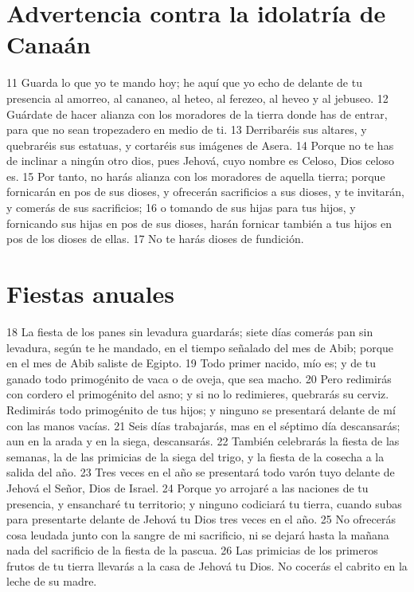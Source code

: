 \section*{Advertencia contra la idolatría de Canaán}

11 Guarda lo que yo te mando hoy; he aquí que yo echo de delante de tu presencia al amorreo, al cananeo, al heteo, al ferezeo, al heveo y al jebuseo.
12 Guárdate de hacer alianza con los moradores de la tierra donde has de entrar, para que no sean tropezadero en medio de ti.
13 Derribaréis sus altares, y quebraréis sus estatuas, y cortaréis sus imágenes de Asera.
14 Porque no te has de inclinar a ningún otro dios, pues Jehová, cuyo nombre es Celoso, Dios celoso es.
15 Por tanto, no harás alianza con los moradores de aquella tierra; porque fornicarán en pos de sus dioses, y ofrecerán sacrificios a sus dioses, y te invitarán, y comerás de sus sacrificios;
16 o tomando de sus hijas para tus hijos, y fornicando sus hijas en pos de sus dioses, harán fornicar también a tus hijos en pos de los dioses de ellas.
17 No te harás dioses de fundición.

\section*{Fiestas anuales}

18 La fiesta de los panes sin levadura guardarás; siete días comerás pan sin levadura, según te he mandado, en el tiempo señalado del mes de Abib; porque en el mes de Abib saliste de Egipto.
19 Todo primer nacido, mío es; y de tu ganado todo primogénito de vaca o de oveja, que sea macho.
20 Pero redimirás con cordero el primogénito del asno; y si no lo redimieres, quebrarás su cerviz. Redimirás todo primogénito de tus hijos; y ninguno se presentará delante de mí con las manos vacías.
21 Seis días trabajarás, mas en el séptimo día descansarás; aun en la arada y en la siega, descansarás.
22 También celebrarás la fiesta de las semanas, la de las primicias de la siega del trigo, y la fiesta de la cosecha a la salida del año.
23 Tres veces en el año se presentará todo varón tuyo delante de Jehová el Señor, Dios de Israel.
24 Porque yo arrojaré a las naciones de tu presencia, y ensancharé tu territorio; y ninguno codiciará tu tierra, cuando subas para presentarte delante de Jehová tu Dios tres veces en el año.
25 No ofrecerás cosa leudada junto con la sangre de mi sacrificio, ni se dejará hasta la mañana nada del sacrificio de la fiesta de la pascua.
26 Las primicias de los primeros frutos de tu tierra llevarás a la casa de Jehová tu Dios. No cocerás el cabrito en la leche de su madre.

